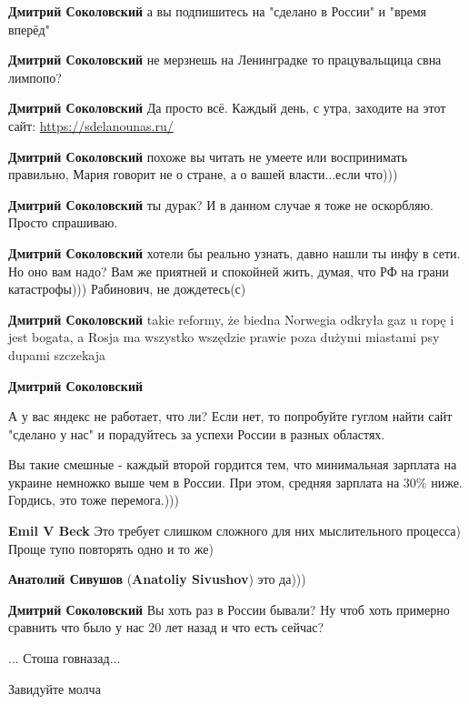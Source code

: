 \begin{itemize}
\begin{itemize}
\textbf{Дмитрий Соколовский} а вы подпишитесь на "сделано в России" и "время вперёд"

\textbf{Дмитрий Соколовский} не мерзнешь на Ленинградке то працувальщица свна лимпопо?

\textbf{Дмитрий Соколовский} Да просто всё. Каждый день, с утра, заходите на этот сайт: \url{https://sdelanounas.ru/}

\textbf{Дмитрий Соколовский} похоже вы читать не умеете или воспринимать правильно, Мария говорит не о стране, а о вашей власти...если что)))

\textbf{Дмитрий Соколовский} ты дурак? И в данном случае я тоже не оскорбляю. Просто спрашиваю.

\textbf{Дмитрий Соколовский} хотели бы реально узнать, давно нашли ты инфу в сети. Но оно вам надо? Вам же приятней и спокойней жить, думая, что РФ на грани катастрофы)))
Рабинович, не дождетесь(с)

\textbf{Дмитрий Соколовский} takie reformy, że biedna Norwegia odkryła gaz u ropę i jest bogata, a Rosja ma wszystko wszędzie prawie poza dużymi miastami psy dupami szczekaja

\textbf{Дмитрий Соколовский} 

А у вас яндекс не работает, что ли? Если нет, то попробуйте гуглом найти сайт
"сделано у нас" и порадуйтесь за успехи России в разных областях.


Вы такие смешные - каждый второй гордится тем, что минимальная зарплата на
украине немножко выше чем в России. При этом, средняя зарплата на 30\% ниже.
Гордись, это тоже перемога.)))

\textbf{Emil V Beck} Это требует слишком сложного для них мыслительного процесса) Проще тупо повторять одно и то же)

\textbf{Анатолий Сивушов} (\textbf{Anatoliy Sivushov}) это да)))

\textbf{Дмитрий Соколовский} Вы хоть раз в России бывали? Ну чтоб хоть примерно сравнить что было у нас 20 лет назад и что есть сейчас?

\end{itemize} %

... Стоша говназад...

Завидуйте молча

\end{itemize} %
